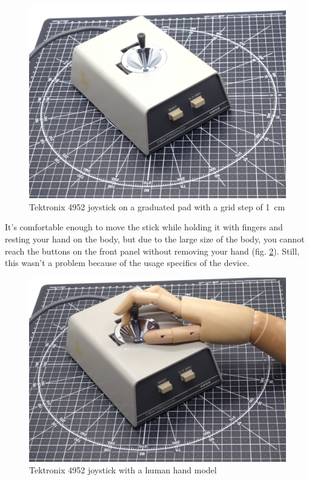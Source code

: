 \documentclass[11pt, a4paper]{article}
\begin{document}
\begin{figure}[h]
    \centering
    \includegraphics[scale=0.43]{1975_Tektronix_4952_Joystick/size_30.jpg}
    \caption{Tektronix 4952 joystick on a graduated pad with a grid step of 1~cm}
    \label{fig:TektronixJoystickSize}
\end{figure}

It's comfortable enough to move the stick while holding it with fingers and resting your hand on the body, but due to the large size of the body, you cannot reach the buttons on the front panel without removing your hand (fig. \ref{fig:TektronixJoystickHand}). Still, this wasn't a problem because of the usage specifics of the device.

\begin{figure}[h]
    \centering
    \includegraphics[scale=0.43]{1975_Tektronix_4952_Joystick/hand_05.jpg}
    \caption{Tektronix 4952 joystick with a human hand model}
    \label{fig:TektronixJoystickHand}
\end{figure}
\end{document}
